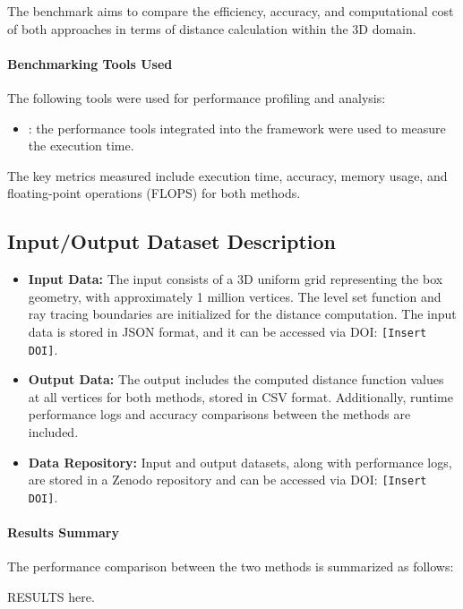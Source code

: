 The benchmark aims to compare the efficiency, accuracy, and computational cost of both approaches in terms of distance calculation within the 3D domain.

\paragraph{Benchmarking Tools Used}
The following tools were used for performance profiling and analysis:
\begin{itemize}
\item \textbf{\Feelpp}: the performance tools integrated into the \Feelpp framework were used to measure the execution time.
\end{itemize}

The key metrics measured include execution time, accuracy, memory usage, and floating-point operations (FLOPS) for both methods.

\subsection{Input/Output Dataset Description}
\begin{itemize}
    \item \textbf{Input Data:} The input consists of a 3D uniform grid representing the box geometry, with approximately 1 million vertices. The level set function and ray tracing boundaries are initialized for the distance computation. The input data is stored in JSON format, and it can be accessed via DOI: \texttt{[Insert DOI]}.

    \item \textbf{Output Data:} The output includes the computed distance function values at all vertices for both methods, stored in CSV format. Additionally, runtime performance logs and accuracy comparisons between the methods are included.

    \item \textbf{Data Repository:} Input and output datasets, along with performance logs, are stored in a Zenodo repository and can be accessed via DOI: \texttt{[Insert DOI]}.
\end{itemize}

\paragraph{Results Summary}
The performance comparison between the two methods is summarized as follows:

RESULTS here.


